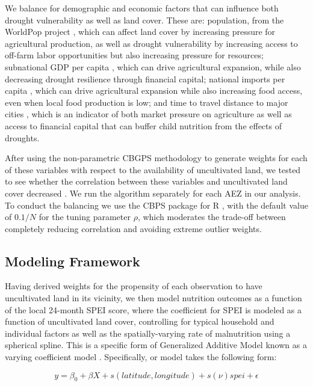 \documentclass{article}
\begin{document}
We balance for demographic and economic factors that can influence both drought vulnerability as well as land cover.  These are: population, from the WorldPop project \cite{Tatem2017}, which can affect land cover by increasing pressure for agricultural production, as well as drought vulnerability by increasing access to off-farm labor opportunities but also increasing pressure for resources; subnational GDP per capita \cite{Kummu2018}, which can drive agricultural expansion, while also decreasing drought resilience through financial capital; national imports per capita \cite{WorldBank2017}, which can drive agricultural expansion \cite{Meyfroidt2013} while also increasing food access, even when local food production is low; and time to travel distance to major cities \cite{Weiss2018, Uchida2008}, which is an indicator of both market pressure on agriculture as well as access to financial capital that can buffer child nutrition from the effects of droughts.

After using the non-parametric CBGPS methodology to generate weights for each of these variables with respect to the availability of uncultivated land, we tested to see whether the correlation between these variables and uncultivated land cover decreased \cite{Fong2018}.  We run the algorithm separately for each AEZ in our analysis.  To conduct the balancing we use the CBPS package for R \cite{Fong2018a}, with the default value of $0.1/N$ for the tuning parameter $\rho$, which moderates the trade-off between completely reducing correlation and avoiding extreme outlier weights.

\subsection{Modeling Framework}
Having derived weights for the propensity of each observation to have uncultivated land in its vicinity, we then model nutrition outcomes as a function of the local 24-month SPEI score, where the coefficient for SPEI is modeled as a function of uncultivated land cover, controlling for typical household and individual factors as well as the spatially-varying rate of malnutrition using a spherical spline.  This is a specific form of Generalized Additive Model \cite{Hastie1986} known as a varying coefficient model \cite{Wood2017}.  Specifically, or model takes the following form:

\begin{equation}
 y = \beta_0 + \beta X + s(latitude, longitude) + s(\nu) spei + \epsilon \label{eqn:GAM}
\end{equation}
\end{document}
